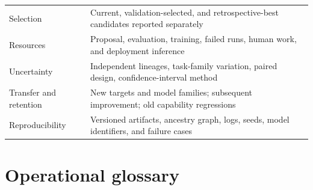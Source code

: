 \documentclass[11pt,american,]{article}
\begin{document}
\begin{longtable}[]{@{}ll@{}}
\begin{minipage}[t]{0.47\columnwidth}
Selection\strut
\end{minipage} & \begin{minipage}[t]{0.47\columnwidth}\raggedright
Current, validation-selected, and retrospective-best candidates reported
separately\strut
\end{minipage}\tabularnewline
\begin{minipage}[t]{0.47\columnwidth}\raggedright
Resources\strut
\end{minipage} & \begin{minipage}[t]{0.47\columnwidth}\raggedright
Proposal, evaluation, training, failed runs, human work, and deployment
inference\strut
\end{minipage}\tabularnewline
\begin{minipage}[t]{0.47\columnwidth}\raggedright
Uncertainty\strut
\end{minipage} & \begin{minipage}[t]{0.47\columnwidth}\raggedright
Independent lineages, task-family variation, paired design,
confidence-interval method\strut
\end{minipage}\tabularnewline
\begin{minipage}[t]{0.47\columnwidth}\raggedright
Transfer and retention\strut
\end{minipage} & \begin{minipage}[t]{0.47\columnwidth}\raggedright
New targets and model families; subsequent improvement; old capability
regressions\strut
\end{minipage}\tabularnewline
\begin{minipage}[t]{0.47\columnwidth}\raggedright
Reproducibility\strut
\end{minipage} & \begin{minipage}[t]{0.47\columnwidth}\raggedright
Versioned artifacts, ancestry graph, logs, seeds, model identifiers, and
failure cases\strut
\end{minipage}\tabularnewline
\bottomrule
\end{longtable}


\hypertarget{operational-glossary}{%
\section{Operational glossary}\label{operational-glossary}}
\end{document}
